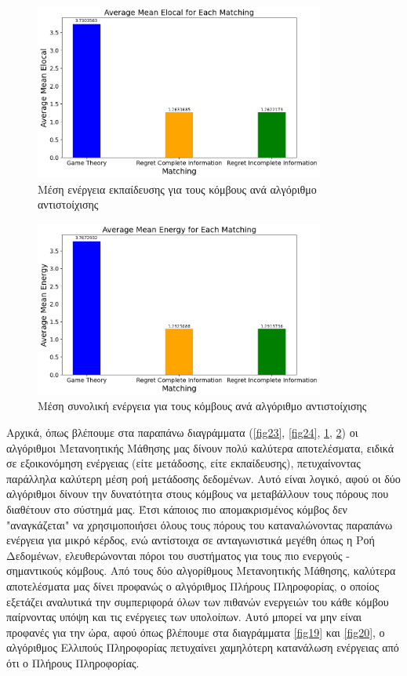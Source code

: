 \newpage

\begin{figure}[H]
    \centering
    \includegraphics[width=0.85\textwidth]{figures/chapter4/Average_Mean_Elocal.png}
    \caption{Μέση ενέργεια εκπαίδευσης για τους κόμβους ανά αλγόριθμο αντιστοίχισης}
    \label{fig25}
\end{figure}

\begin{figure}[H]
    \centering
    \includegraphics[width=0.85\textwidth]{figures/chapter4/Average_Mean_Energy.png}
    \caption{Μέση συνολική ενέργεια για τους κόμβους ανά αλγόριθμο αντιστοίχισης}
    \label{fig26}
\end{figure}

Αρχικά, όπως βλέπουμε στα παραπάνω διαγράμματα (\ref{fig23}, \ref{fig24}, \ref{fig25}, \ref{fig26}) οι αλγόριθμοι Μετανοητικής Μάθησης μας δίνουν πολύ καλύτερα αποτελέσματα, ειδικά σε εξοικονόμηση ενέργειας (είτε μετάδοσης, είτε εκπαίδευσης), πετυχαίνοντας παράλληλα καλύτερη μέση ροή μετάδοσης δεδομένων. Αυτό είναι λογικό, αφού οι δύο αλγόριθμοι δίνουν την δυνατότητα στους κόμβους να μεταβάλλουν τους πόρους που διαθέτουν στο σύστημά μας. Έτσι κάποιος πιο απομακρισμένος κόμβος δεν "αναγκάζεται" να χρησιμοποιήσει όλους τους πόρους του καταναλώνοντας παραπάνω ενέργεια για μικρό κέρδος, ενώ αντίστοιχα σε ανταγωνιστικά μεγέθη όπως η Ροή Δεδομένων, ελευθερώνονται πόροι του συστήματος για τους πιο ενεργούς - σημαντικούς κόμβους. Από τους δύο αλγορίθμους Μετανοητικής Μάθησης, καλύτερα αποτελέσματα μας δίνει προφανώς ο αλγόριθμος Πλήρους Πληροφορίας, ο οποίος εξετάζει αναλυτικά την συμπεριφορά όλων των πιθανών ενεργειών του κάθε κόμβου παίρνοντας υπόψη και τις ενέργειες των υπολοίπων. Αυτό μπορεί να μην είναι προφανές για την ώρα, αφού όπως βλέπουμε στα διαγράμματα \ref{fig19} και \ref{fig20}, ο αλγόριθμος Ελλιπούς Πληροφορίας πετυχαίνει χαμηλότερη κατανάλωση ενέργειας από ότι ο Πλήρους Πληροφορίας.

